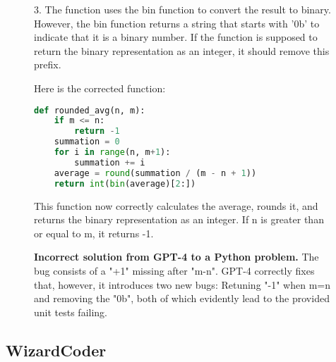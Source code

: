 \begin{figure}[htbp]
3. The function uses the bin function to convert the result to binary. However, the bin function returns a string that starts with '0b' to indicate that it is a binary number. If the function is supposed to return the binary representation as an integer, it should remove this prefix.

Here is the corrected function:

\begin{lstlisting}[language=Python,breaklines=true,basicstyle=\ttfamily\scriptsize]
def rounded_avg(n, m):
    if m <= n:
        return -1
    summation = 0
    for i in range(n, m+1):
        summation += i
    average = round(summation / (m - n + 1))
    return int(bin(average)[2:])
\end{lstlisting}

This function now correctly calculates the average, rounds it, and returns the binary representation as an integer. If n is greater than or equal to m, it returns -1.

\hrulefill

\caption{\textbf{Incorrect solution from GPT-4 to a \evalf{} Python problem.} The bug consists of a "+1" missing after "m-n". GPT-4 correctly fixes that, however, it introduces two new bugs: Retuning "-1" when m=n and removing the "0b", both of which evidently lead to the provided unit tests failing.}
\label{fig:gpt4pyaddbugs}
\end{figure}


\FloatBarrier


\subsection{WizardCoder}
\label{sec:exampleswizardcoder}


